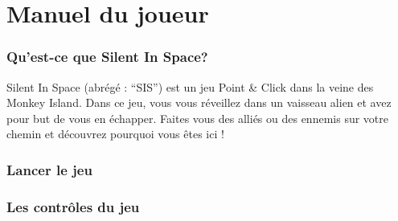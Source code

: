 \documentclass[./standalone.tex]{subfiles}
\begin{document}
\part{Manuel du joueur}

\section{Qu'est-ce que Silent In Space?}
Silent In Space (abrégé : “SIS”) est un jeu Point \& Click dans la veine des Monkey Island. Dans ce jeu, vous vous réveillez dans un vaisseau alien et avez pour but de vous en échapper. Faites vous des alliés ou des ennemis sur votre chemin et découvrez pourquoi vous êtes ici ! 

\section{Lancer le jeu}


\newpage

\section{Les contrôles du jeu}
\end{document}
